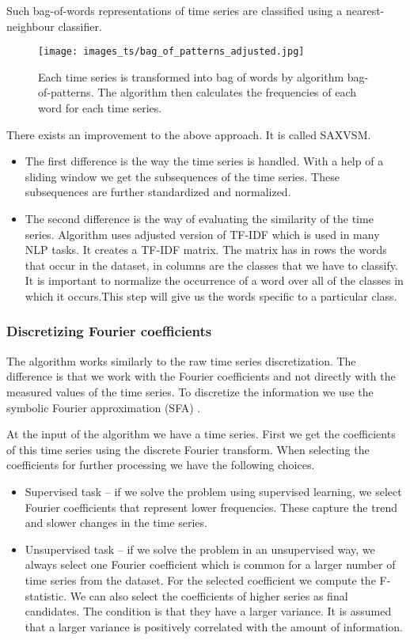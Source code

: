 \documentclass[thesis=M,english]{FITthesis}[2019/12/23]
\begin{document}
Such bag-of-words representations of time series are classified using a nearest-neighbour classifier.

\begin{figure}[ht!]
    \centering
    \texttt{[image: images\_ts/bag\_of\_patterns\_adjusted.jpg]}
    \caption{ Each time series is transformed into bag of words by  algorithm bag-of-patterns. The algorithm then calculates the frequencies of each word for each time series\cite{bag_of_patterns_img}.}
    \label{fig:bag_of_patterns}
\end{figure}

There exists an improvement to the above approach. It is called SAXVSM. 

\begin{itemize}
		\item The first difference is the way the time series is handled. With a help of a sliding window we get the subsequences of the time series. These subsequences are further standardized and normalized.
		\item The second difference is the way of evaluating the similarity of the time series. Algorithm uses adjusted version of TF-IDF which is used in many NLP tasks. It creates a TF-IDF matrix. The matrix has in rows the words that occur in the dataset, in columns are the classes that we have to classify. It is important to normalize the occurrence of a word over all of the classes in which it occurs.This step will give us the words specific to a particular class. 
	\end{itemize}

\subsubsection{Discretizing Fourier coefficients}
The algorithm works similarly to the raw time series discretization. The difference is that we work with the Fourier coefficients and not directly with the measured values of the time series. To discretize the information we use the symbolic Fourier approximation (SFA) \cite{symbolic_fourier_approximation}.

At the input of the algorithm we have a time series. First we get the coefficients of this time series using the discrete Fourier transform. When selecting the coefficients for further processing we have the following choices.

\begin{itemize}
		\item Supervised task -- if we solve the problem using supervised learning, we select Fourier coefficients that represent lower frequencies. These capture the trend and slower changes in the time series.
		\item Unsupervised task -- if we solve the problem in an unsupervised way, we always select one Fourier coefficient which is common for a larger number of time series from the dataset. For the selected coefficient we compute the F-statistic. We can also select the coefficients of higher series as final candidates. The condition is that they have a larger variance. It is assumed that a larger variance is positively correlated with the amount of information.
	\end{itemize}
\end{document}
